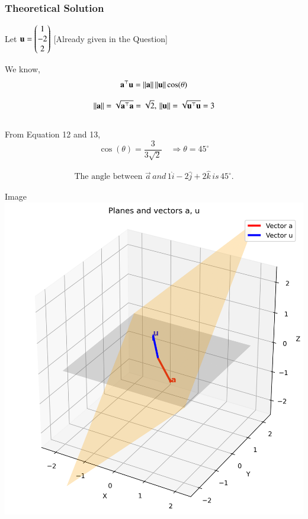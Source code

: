 \documentclass{beamer}
\begin{document}
\begin{frame}[fragile]
\frametitle{Theoretical Solution}
Let $\mathbf{u} = \begin{pmatrix}1 \\ -2 \\ 2\end{pmatrix}$ [Already given in the Question]

We know,
\begin{equation}
    \mathbf{a}^\top\mathbf{u} = \left\lVert\mathbf{a}\right\rVert\left\lVert\mathbf{u}\right\rVert\cos(\theta)
\end{equation}

\begin{equation}
    \left\lVert\mathbf{a}\right\rVert = \sqrt{\mathbf{a}^\top\mathbf{a}} = \sqrt{2}, \, \left\lVert\mathbf{u}\right\rVert = \sqrt{\mathbf{u}^\top\mathbf{u}} = 3
\end{equation}\\

From Equation 12 and 13,
\begin{equation}
    \cos(\theta) = \dfrac{3}{3\sqrt{2}} \quad \Rightarrow \theta = 45^\circ
\end{equation}

\begin{align}
  \boxed{\text{The angle between } \vec{a} \, and \, 1\hat{i} -2\hat{j}+2\hat{k} \, is \, 45^{\circ}.}  
\end{align}
\end{frame}

\begin{frame}{Image}
   \centering
    \includegraphics[width=\columnwidth, height=0.8\textheight, keepaspectratio]{figs/fig1.png}
    \label{fig:Beamer/figs/fig1.png}
\end{frame}
\end{document}
